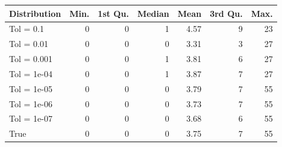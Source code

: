 \begin{figure} 
\begin{tabular}{lrrrrrr}
 Distribution & Min. & 1st Qu. & Median & Mean & 3rd Qu. & Max. \\ 
  \hline
\hline
Tol =  0.1 & 0 & 0 & 1 & 4.57 & 9 & 23 \\ 
  Tol =  0.01 & 0 & 0 & 0 & 3.31 & 3 & 27 \\ 
  Tol =  0.001 & 0 & 0 & 1 & 3.81 & 6 & 27 \\ 
  Tol =  1e-04 & 0 & 0 & 1 & 3.87 & 7 & 27 \\ 
  Tol =  1e-05 & 0 & 0 & 0 & 3.79 & 7 & 55 \\ 
  Tol =  1e-06 & 0 & 0 & 0 & 3.73 & 7 & 55 \\ 
  Tol =  1e-07 & 0 & 0 & 0 & 3.68 & 6 & 55 \\ 
  True & 0 & 0 & 0 & 3.75 & 7 & 55 \\ 
  \end{tabular}
\label{tab:SummaryTable}
\end{figure} 
